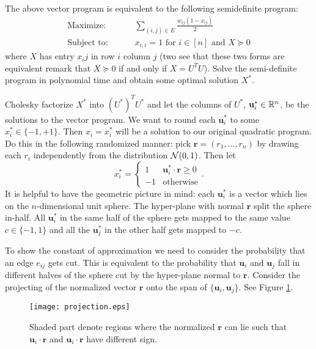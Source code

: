\documentclass[
10pt, %
letterpaper, %
onecolumn, %
]{article}
\begin{document}
The above vector program is equivalent to the following semidefinite program:
\begin{align*}
\mbox{Maximize: }\qquad & \sum_{(i,j)\in E}\frac{w_{ij}(1-x_{ij})}{2}\\
\mbox{Subject to: }\qquad & x_{i,i} = 1 \mbox{ for }i \in [n] \mbox{ and } X \succeq 0
\end{align*}
where $X$ has entry $x_ij$ in row $i$ column $j$ (two see that these two forms are equivalent remark that $X \succeq 0$ if and only if $X = U^TU$). Solve the semi-definite program in polynomial time and obtain some optimal solution $X^*$.

Cholesky factorize $X^*$ into $(U^*)^TU^*$ and let the columns of $U^*$, $\mathbf{u}_i^* \in \mathbb{R}^n$, be the solutions to the vector program. We want to round each $\mathbf{u}_i^*$ to some $x_i^* \in \{-1,+1\}$. Then $x_i = x_i^*$ will be a solution to our original quadratic program. Do this in the following randomized manner: pick $\mathbf{r} = (r_1, ..., r_n)$ by drawing each $r_i$ independently from the distribution $\mathcal{N}(0,1)$. Then let
\[x_i^* = \begin{cases}
1 &\mathbf{u}_i^* \cdot \mathbf{r} \geq 0\\
-1 &\mbox{otherwise}
\end{cases}.\]
It is helpful to have the geometric picture in mind: each $\mathbf{u}_i^*$ is a vector which lies on the $n$-dimensional unit sphere. The hyper-plane with normal $\mathbf{r}$ split the sphere in-half. All $\mathbf{u}_i^*$ in the same half of the sphere gets mapped to the same value $c \in \{-1,1\}$ and all the $\mathbf{u}_j^*$ in the other half gets mapped to $-c$. 

To show the constant of approximation we need to consider the probability that an edge $e_{ij}$ gets cut. This is equivalent to the probability that $\mathbf{u}_i$ and $\mathbf{u}_j$ fall in different halves of the sphere cut by the hyper-plane normal to $\mathbf{r}$. Consider the projecting of the normalized vector $\mathbf{r}$ onto the span of $\{\mathbf{u}_{i}, \mathbf{u}_j\}$. See Figure \ref{fig:projection}. 

\begin{figure}[ht]
\centering
	\texttt{[image: projection.eps]}
\caption{Shaded part denote regions where the normalized $\mathbf{r}$ can lie such that $\mathbf{u}_i\cdot \mathbf{r}$ and $\mathbf{u}_i\cdot \mathbf{r}$ have different sign.}
\label{fig:projection}
\end{figure}
\end{document}
